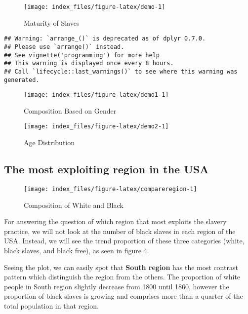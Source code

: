 \documentclass[
]{article}
\begin{document}
\begin{figure}

{\centering \texttt{[image: index\_files/figure-latex/demo-1]} 

}

\caption{Maturity of Slaves}\label{fig:demo}
\end{figure}

\begin{verbatim}
## Warning: `arrange_()` is deprecated as of dplyr 0.7.0.
## Please use `arrange()` instead.
## See vignette('programming') for more help
## This warning is displayed once every 8 hours.
## Call `lifecycle::last_warnings()` to see where this warning was generated.
\end{verbatim}

\begin{figure}
\texttt{[image: index\_files/figure-latex/demo1-1]} \caption{Composition Based on Gender}\label{fig:demo1}
\end{figure}

\begin{figure}
\texttt{[image: index\_files/figure-latex/demo2-1]} \caption{Age Distribution}\label{fig:demo2}
\end{figure}

\hypertarget{the-most-exploiting-region-in-the-usa}{%
\subsection{The most exploiting region in the USA}\label{the-most-exploiting-region-in-the-usa}}

\begin{figure}

{\centering \texttt{[image: index\_files/figure-latex/compareregion-1]} 

}

\caption{Composition of White and Black}\label{fig:compareregion}
\end{figure}

For answering the question of which region that most exploits the slavery practice, we will not look at the number of black slaves in each region of the USA. Instead, we will see the trend proportion of these three categories (white, black slaves, and black free), as seen in figure \ref{fig:compareregion}.

Seeing the plot, we can easily spot that \textbf{South region} has the most contrast pattern which distinguish the region from the others. The proportion of white people in South region slightly decrease from 1800 until 1860, however the proportion of black slaves is growing and comprises more than a quarter of the total population in that region.
\end{document}

